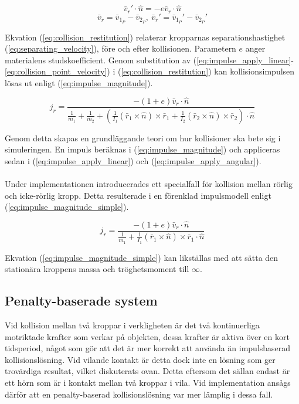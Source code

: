 \documentclass[a4paper,12pt,twopage,swedish]{article}
\begin{document}
\begin{equation}\label{eq:collision_restitution}
\bar{v}_r' \cdot \hat{n} = -e\bar{v}_r \cdot \hat{n}
\end{equation}
\begin{equation}\label{eq:separating_velocity}
\bar{v}_r = \bar{v}_{1_P} - \bar{v}_{2_P}, \ \bar{v}_r' = \bar{v}_{1_P}' - \bar{v}_{2_P}'
\end{equation}

Ekvation (\ref{eq:collision_restitution}) relaterar kropparnas separationshastighet (\ref{eq:separating_velocity}), före och efter kollisionen. Parametern $e$ anger materialens studskoefficient. Genom substitution av (\ref{eq:impulse_apply_linear}-\ref{eq:collision_point_velocity}) i (\ref{eq:collision_restitution}) kan kollisionsimpulsen lösas ut enligt (\ref{eq:impulse_magnitude}).

\begin{equation}\label{eq:impulse_magnitude}
j_r = \frac{-(1+e)\bar{v}_r \cdot \hat{n}}
{\frac{1}{m_1}+\frac{1}{m_2}+(\frac{1}{I_1}(\bar{r}_1 \times \hat{n}) \times \bar{r}_1+\frac{1}{I_2}(\bar{r}_2 \times \hat{n}) \times \bar{r}_2)\cdot \hat{n}}
\end{equation}

Genom detta skapas en grundläggande teori om hur kollisioner ska bete sig i simuleringen. En impuls beräknas i (\ref{eq:impulse_magnitude}) och appliceras sedan i (\ref{eq:impulse_apply_linear}) och (\ref{eq:impulse_apply_angular}).
\\
\\Under implementationen introducerades ett specialfall för kollision mellan rörlig och icke-rörlig kropp. Detta resulterade i en förenklad impulsmodell enligt (\ref{eq:impulse_magnitude_simple}).

\begin{equation}\label{eq:impulse_magnitude_simple}
j_r = \frac{-(1+e)\bar{v}_r \cdot \hat{n}}
{\frac{1}{m_1}+\frac{1}{I_1}(\bar{r}_1 \times \hat{n}) \times \bar{r}_1 \cdot \hat{n}}
\end{equation}

Ekvation (\ref{eq:impulse_magnitude_simple}) kan likställas med att sätta den stationära kroppens massa och tröghetsmoment till $\infty$.

\subsection{Penalty-baserade system}
Vid kollision mellan två kroppar i verkligheten är det två kontinuerliga motriktade krafter som verkar på objekten, dessa krafter är aktiva över en kort tidsperiod, något som gör att det är mer korrekt att använda än impulsbaserad kollisionslösning.
Vid vilande kontakt är detta dock inte en lösning som ger trovärdiga resultat, vilket diskuterats ovan. Detta eftersom det sällan endast är ett hörn som är i kontakt mellan två kroppar i vila. Vid implementation ansågs därför att en penalty-baserad kollisionslösning var mer lämplig i dessa fall.
\end{document}
